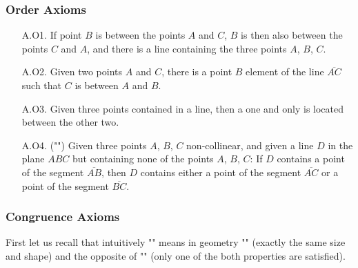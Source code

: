 	\subsubsection{Order Axioms}
	\begin{enumerate}
		\item[A.O1.] If point $B$ is between the points $A$ and $C$, $B$ is then also between the points $C$ and $A$, and there is a line containing the three points $A$, $B$, $C$.

		\item[A.O2.] Given two points $A$ and $C$, there is a point $B$ element of the line $\overline{AC}$ such that $C$ is between $A$ and $B$.

		\item[A.O3.]  Given three points contained in a line, then a one and only is located between the other two.

		\item[A.O4.] ("") Given three points $A$, $B$, $C$ non-collinear, and given a line $D$ in the plane $ABC$ but containing none of the points $A$, $B$, $C$: If $D$ contains a point of the segment $\overline{AB}$, then $D$ contains either a point of the segment $\overline{AC}$ or a point of the segment $\overline{BC}$.
	\end{enumerate}

	\pagebreak
	\subsubsection{Congruence Axioms}\label{congruence axioms}
	First let us recall that intuitively "" means in geometry "" (exactly the same size and shape) and the opposite of "" (only one of the both properties are satisfied).
	
